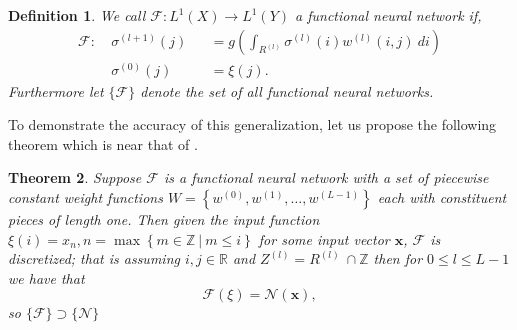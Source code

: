 \documentclass{article}
\newtheorem{theorem}{Theorem}
\newtheorem{definition}[theorem]{Definition}
\begin{document}
\begin{definition}
We call $\mathcal{F}: L^1(X) \to L^1(Y)$ a functional neural network if,
\begin{equation}
          \begin{alignedat}{2}
        \mathcal{F}:\ &\sigma^{(l+1)}(j) & &=  g\left(\int_{R^{(l)}} \sigma^{(l)}(i) w^{(l)}(i,j)\ di \right)  \\
        &\sigma^{(0)}(j) & &= \xi(j). 
        \end{alignedat}
\end{equation}
Furthermore let $\{\mathcal{F}\}$ denote the set of all functional neural networks.
\end{definition}
To demonstrate the accuracy of this generalization, let us propose the following theorem which is near that of \cite{roux}.
\begin{theorem} Suppose $\mathcal{F}$ is a functional neural network with a set of piecewise constant weight functions $W = \left\{w^{(0)}, w^{(1)}, \dots, w^{(L-1)}\right\}$ each with constituent pieces of length one. Then given the input function $\xi(i) = x_n, n = \max\left\{m\in \mathbb{Z}\ |\ m\leq i\right\}$ for some input vector $\pmb{x}$, $\mathcal{F}$ is discretized; that is assuming $i,j \in \mathbb{R}$ and $Z^{(l)} = R^{(l)}\ \cap \mathbb{Z}$ then for $0 \leq l \leq L-1$ we have that
\begin{equation}\mathcal{F}(\xi)= \mathcal{N}(\pmb{x}),\end{equation}
so $\{\mathcal{F}\} \supset \{\mathcal{N}\}$
\end{theorem}
\end{document}

